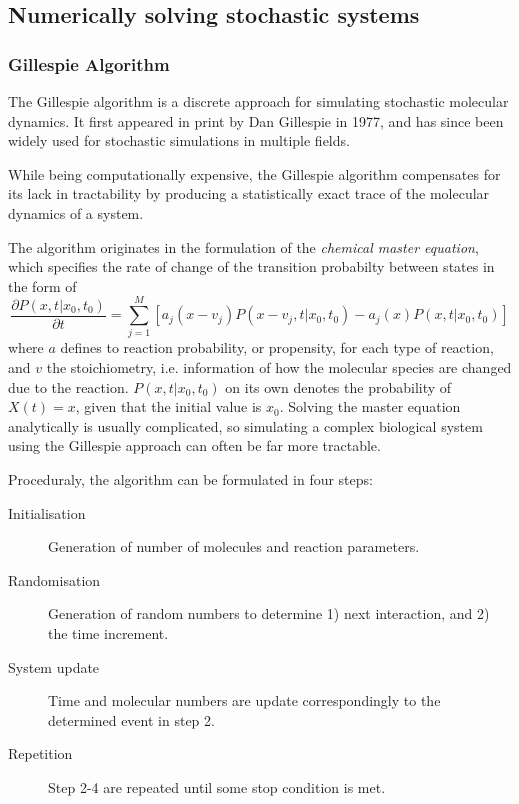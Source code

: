 \subsection[Stochastic Simulations]{Numerically solving stochastic systems}
\label{sec:stoch_sim}
\subsubsection{Gillespie Algorithm}
\label{sec:gillespie}
The Gillespie algorithm is a discrete approach for simulating stochastic
molecular dynamics. It first appeared in print by Dan Gillespie in 1977, and has
since been widely used for stochastic simulations in multiple fields.

While being computationally expensive, the Gillespie algorithm compensates for
its lack in tractability by producing a statistically exact trace of the
molecular dynamics of a system. 

The algorithm originates in the formulation of the \textit{chemical master equation},
which specifies the rate of change of the transition probabilty between states
in the form of 
\begin{equation}
  \dfrac{\partial P\left( x,t | x_0, t_0 \right)}{\partial t} = 
  \sum_{j =
    1}^{M} \left[ a_j\left( x-v_j \right)P\left( x-v_j, t|x_0,t_0 \right) -
    a_j(x)P\left( x,t|x_0,t_0 \right) \right]
\end{equation}
where $a$ defines to reaction probability, or propensity, for each type of reaction, and
$v$ the stoichiometry, i.e. information of how the molecular species are changed
due to the reaction. $P(x,t | x_0, t_0)$ on its own denotes the probability of
$X(t) = x$, given that the initial value is $x_0$. Solving the master equation
analytically is usually complicated, so  
simulating a complex biological system using the Gillespie approach can often be
far more tractable.

Proceduraly, the algorithm can be formulated in four steps: 
\begin{description}
  \item[Initialisation] Generation of number of molecules and reaction
    parameters. 
  \item[Randomisation] Generation of random numbers to determine 1) next
    interaction, and 2) the time increment.
  \item[System update] Time and molecular numbers are update correspondingly
    to the determined event in step 2.
  \item[Repetition] Step 2-4 are repeated until some stop condition is met.
\end{description}

